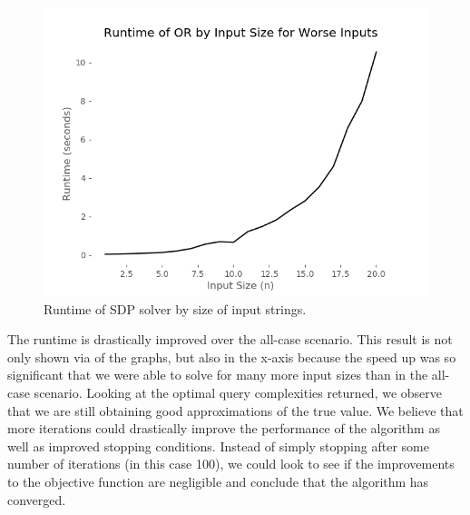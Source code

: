 \begin{figure}[ht]
\centering
\includegraphics[scale=.4]{figures/or_worst_runtime.png}
\caption{Runtime of SDP solver by size of input strings.}
\label{fig:or_worst_runtime}
\end{figure}

The runtime is drastically improved over the all-case scenario. 
This result is not only shown via  of the graphs, 
but also in the x-axis because the speed up was so 
significant that we were able to solve for many more 
input sizes than in the all-case scenario. 
Looking at the optimal query complexities returned, 
we observe that we are still obtaining good 
approximations of the true value. 
We believe that more iterations could drastically 
improve the performance of the algorithm as well as 
improved stopping conditions. Instead of simply stopping 
after some number of iterations (in this case 100), 
we could look to see if the improvements to the objective 
function are negligible and conclude that the algorithm has converged.
